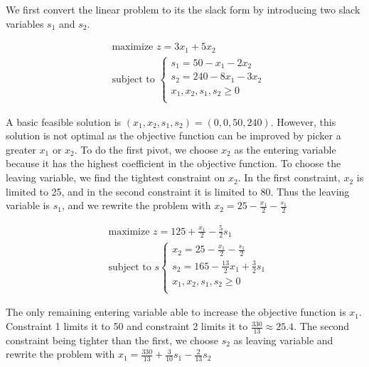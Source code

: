 \documentclass[a4paper, 10pt, twoside]{article}
\begin{document}
\begin{enumerate}[a)]
          We first convert the linear problem to its the slack form by introducing two slack variables $s_1$ and $s_2$.

          \begin{align*}
               & \text{maximize } z = 3x_1 + 5x_2 \\
               & \text{subject to }
              \begin{cases}
                  s_1 = 50 - x_1 - 2x_2    \\
                  s_2 = 240 - 8x_1 - 3x_2  \\
                  x_1, x_2, s_1, s_2 \ge 0 \\
              \end{cases}
          \end{align*}

          A basic feasible solution is $(x_1, x_2, s_1, s_2) = (0, 0, 50, 240)$. However, this solution is not optimal as the objective function can be improved by picker a greater $x_1$ or $x_2$. To do the first pivot, we choose $x_2$ as the entering variable because it has the highest coefficient in the objective function. To choose the leaving variable, we find the tightest constraint on $x_2$. In the first constraint, $x_2$ is limited to 25, and in the second constraint it is limited to 80. Thus the leaving variable is $s_1$, and we rewrite the problem with $x_2 = 25 - \frac{x_1}{2} - \frac{s_1}{2}$

          \begin{align*}
               & \text{maximize } z = 125 + \frac{x_1}{2} - \frac{5}{2}s_1 \\
               & \text{subject to }s
              \begin{cases}
                  x_2 = 25 - \frac{x_1}{2} - \frac{s_1}{2}     \\
                  s_2 = 165 - \frac{13}{2}x_1 + \frac{3}{2}s_1 \\
                  x_1, x_2, s_1, s_2 \ge 0                     \\
              \end{cases}
          \end{align*}

          The only remaining entering variable able to increase the objective function is $x_1$. Constraint 1 limits it to 50 and constraint 2 limits it to $\frac{330}{13} \approx 25.4$. The second constraint being tighter than the first, we choose $s_2$ as leaving variable and rewrite the problem with $x_1=\frac{330}{13}+\frac{3}{10}s_1-\frac{2}{13}s_2$


\end{enumerate}
\end{document}
